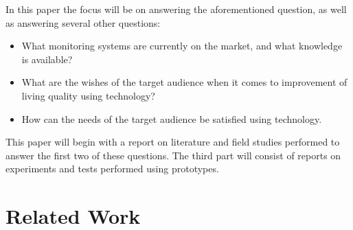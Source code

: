 \documentclass{below-ext}
\begin{document}
In this paper the focus will be on answering the aforementioned question, as well as answering several other questions:
\begin{itemize}
\item What monitoring systems are currently on the market, and what knowledge is available?
\item  What are the wishes of the target audience when it comes to improvement of living quality using technology?
\item How can the needs of the target audience be satisfied using technology.
\end{itemize}
This paper will begin with a report on literature and field studies performed to answer the first two of these questions. The third part will consist of reports on experiments and tests performed using prototypes. 


\section{Related Work}



\end{document}
